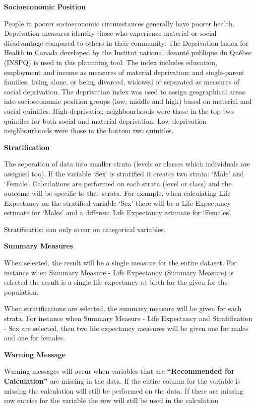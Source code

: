 \documentclass[]{book}
\begin{document}
\textbf{Socioeconomic Position}

People in poorer socioeconomic circumstances generally have poorer
health. Deprivation measures identify those who experience material or
social disadvantage compared to others in their community. The
Deprivation Index for Health in Canada developed by the Institut
national desanté publique du Québec (INSPQ)\citep{INSPQ2000} is used in
this plannning tool. The index includes education, employment and income
as measures of material deprivation; and single-parent families, living
alone, or being divorced, widowed or separated as measures of social
deprivation. The deprivation index was used to assign geographical areas
into socioeconomic position groups (low, middle and high) based on
material and social quintiles. High-deprivation neighbourhoods were
those in the top two quintiles for both social and material deprivation.
Low-deprivation neighbourhoods were those in the bottom two quintiles.

\textbf{Stratification}

The seperation of data into smaller strata (levels or
classes which individuals are assigned too). If the variable `Sex' is
stratified it creates two strata: `Male' and `Female'. Calculations are
performed on each strata (level or class) and the outcome will be
specific to that strata. For example, when calculating Life Expectancy
on the stratified variable `Sex' there will be a Life Expectancy
estimate for `Males' and a different Life Expectancy estimate for
`Females'.

Stratification can only occur on categorical variables.

\textbf{Summary Measures}

When selected, the result will be a single measure for
the entire dataset. For instance when Summary Measure - Life Expectancy
(Summary Measure) is selected the result is a single life expectancy at
birth for the given for the population.

When stratifications are selected, the summary
measure will be given for each strata. For instance when Summary Measure
- Life Expectancy and Stratification - Sex are selected, then two life
expectancy measures will be given one for males and one for females.

\textbf{Warning Message}

Warning messages will occur when variables that are
\textbf{``Recommended for Calculation''} are missing in the data. If the
entire column for the variable is missing the calculation will still be
performed on the data. If there are missing row entries for the variable
the row will still be used in the calculation
\end{document}
